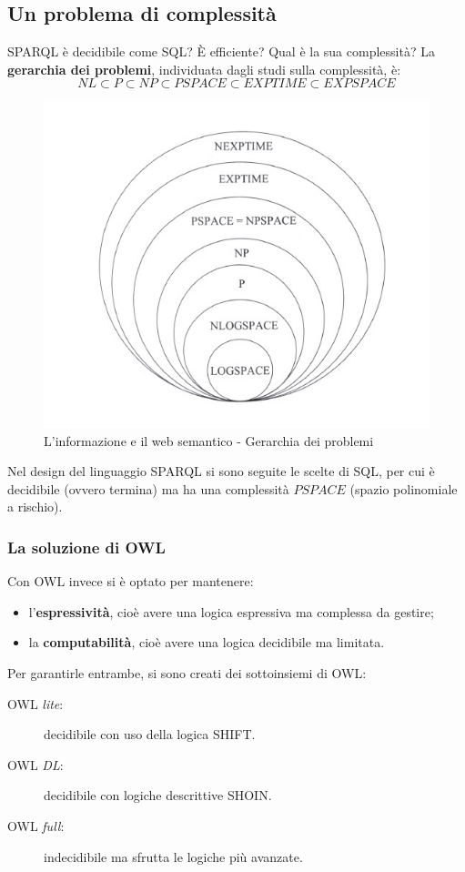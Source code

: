 		\subsection{Un problema di complessità}
			SPARQL è decidibile come SQL? È efficiente?  Qual è la sua complessità?
			La \textbf{gerarchia dei problemi}, individuata dagli studi sulla complessità, è:
			\[
				NL \subset P \subset NP \subset PSPACE \subset EXPTIME \subset EXPSPACE
			\]
			
			\begin{figure} [h]
				\centering
				\includegraphics[scale=1]{images/LInformazioneEIlWebSemantico-Complessita}
				\caption{L'informazione e il web semantico - Gerarchia dei problemi}
				\label{LInformazioneEIlWebSemantico-Complessita}
			\end{figure}
			
			Nel design del linguaggio SPARQL si sono seguite le scelte di SQL, per cui è decidibile (ovvero termina) ma ha una complessità $PSPACE$ (spazio polinomiale a rischio).
			

			\subsubsection{La soluzione di OWL}
				Con OWL invece si è optato per mantenere:
				\begin{itemize}
					\item l'\textbf{espressività}, cioè avere una logica espressiva ma complessa da gestire;
					\item la \textbf{computabilità}, cioè avere una logica decidibile ma limitata.
				\end{itemize}
				Per garantirle entrambe, si sono creati dei sottoinsiemi di OWL:
				\begin{description}
					\item[OWL \emph{lite}:] decidibile con uso della logica SHIFT.
					\item[OWL \emph{DL}:] decidibile con logiche descrittive SHOIN.
					\item[OWL \emph{full}:] indecidibile ma sfrutta le logiche più avanzate.
				\end{description}
				
